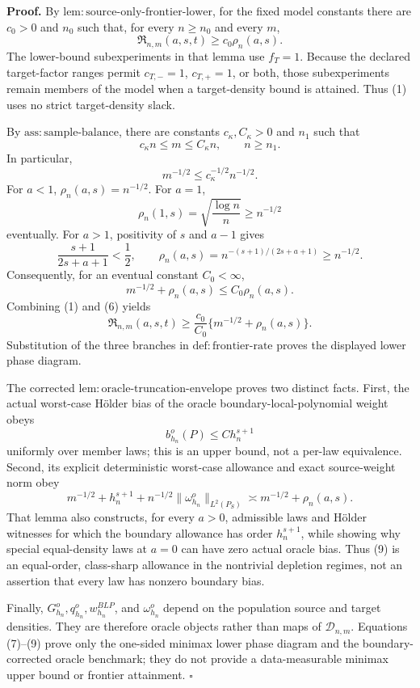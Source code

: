\textbf{Proof.}
By \(\mathrm{lem:source\text{-}only\text{-}frontier\text{-}lower}\), for the fixed model constants there are \(c_0>0\) and \(n_0\) such that, for every \(n\ge n_0\) and every \(m\),
\[
\mathfrak R_{n,m}(a,s,t)\ge c_0\rho_n(a,s).
\tag{1}
\]
The lower-bound subexperiments in that lemma use \(f_T=1\).  Because the declared target-factor ranges permit \(c_{T,-}=1\), \(c_{T,+}=1\), or both, those subexperiments remain members of the model when a target-density bound is attained.  Thus (1) uses no strict target-density slack.

By \(\mathrm{ass:sample\text{-}balance}\), there are constants \(c_\kappa,C_\kappa>0\) and \(n_1\) such that
\[
c_\kappa n\le m\le C_\kappa n,
\qquad n\ge n_1.
\tag{2}
\]
In particular,
\[
m^{-1/2}\le c_\kappa^{-1/2}n^{-1/2}.
\tag{3}
\]
For \(a<1\), \(\rho_n(a,s)=n^{-1/2}\).  For \(a=1\),
\[
\rho_n(1,s)=\sqrt{\frac{\log n}{n}}\ge n^{-1/2}
\tag{4}
\]
eventually.  For \(a>1\), positivity of \(s\) and \(a-1\) gives
\[
\frac{s+1}{2s+a+1}<\frac12,
\qquad
\rho_n(a,s)=n^{-(s+1)/(2s+a+1)}\ge n^{-1/2}.
\tag{5}
\]
Consequently, for an eventual constant \(C_0<\infty\),
\[
m^{-1/2}+\rho_n(a,s)\le C_0\rho_n(a,s).
\tag{6}
\]
Combining (1) and (6) yields
\[
\mathfrak R_{n,m}(a,s,t)
\ge \frac{c_0}{C_0}\{m^{-1/2}+\rho_n(a,s)\}.
\tag{7}
\]
Substitution of the three branches in \(\mathrm{def:frontier\text{-}rate}\) proves the displayed lower phase diagram.

The corrected \(\mathrm{lem:oracle\text{-}truncation\text{-}envelope}\) proves two distinct facts.  First, the actual worst-case Hölder bias of the oracle boundary-local-polynomial weight obeys
\[
b_{h_n}^o(P)\le C h_n^{s+1}
\tag{8}
\]
uniformly over member laws; this is an upper bound, not a per-law equivalence.  Second, its explicit deterministic worst-case allowance and exact source-weight norm obey
\[
m^{-1/2}+h_n^{s+1}
+n^{-1/2}\|\omega_{h_n}^o\|_{L^2(P_S)}
\asymp m^{-1/2}+\rho_n(a,s).
\tag{9}
\]
That lemma also constructs, for every \(a>0\), admissible laws and Hölder witnesses for which the boundary allowance has order \(h_n^{s+1}\), while showing why special equal-density laws at \(a=0\) can have zero actual oracle bias.  Thus (9) is an equal-order, class-sharp allowance in the nontrivial depletion regimes, not an assertion that every law has nonzero boundary bias.

Finally, \(G_{h_n}^o,q_{h_n}^o,w_{h_n}^{BLP}\), and \(\omega_{h_n}^o\) depend on the population source and target densities.  They are therefore oracle objects rather than maps of \(\mathcal D_{n,m}\).  Equations (7)--(9) prove only the one-sided minimax lower phase diagram and the boundary-corrected oracle benchmark; they do not provide a data-measurable minimax upper bound or frontier attainment. \(\square\)